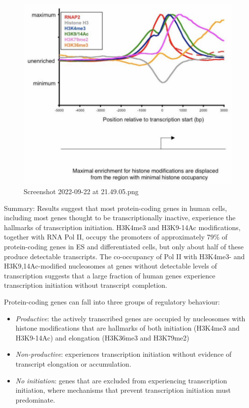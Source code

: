 \begin{figure}
\centering
\includegraphics[width=\textwidth]{../_resources/Screenshot_2022-09-22_at_21-49-05.png}
\caption{Screenshot 2022-09-22 at 21.49.05.png}
\end{figure}

Summary: Results suggest that most protein-coding genes in human cells, including most genes thought to be transcriptionally inactive, experience the hallmarks of transcription initiation. H3K4me3 and H3K9-14Ac modifications, together with RNA Pol II, occupy the promoters of approximately 79\% of protein-coding genes in ES and differentiated cells, but only about half of these produce detectable transcripts. The co-occupancy of Pol II with H3K4me3- and H3K9,14Ac-modified nucleosomes at genes without detectable levels of transcription suggests that a large fraction of human genes experience transcription initiation without transcript completion.

Protein-coding genes can fall into three groups of regulatory behaviour:

\begin{itemize}
\tightlist
\item
  \emph{Productive}: the actively transcribed genes are occupied by nucleosomes with histone modifications that are hallmarks of both initiation (H3K4me3 and H3K9-14Ac) and elongation (H3K36me3 and H3K79me2)
\item
  \emph{Non-productive}: experiences transcription initiation without evidence of transcript elongation or accumulation.
\item
  \emph{No initiation}: genes that are excluded from experiencing transcription initiation, where mechanisms that prevent transcription initiation must predominate.
\end{itemize}

